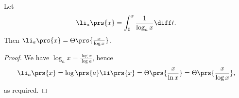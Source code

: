 \documentclass[oneside]{scrbook}
\theoremstyle{definition}
\begin{document}
\begin{corollary} \label{corollary:li-asymptotics}
Let
\begin{align*}
\li_a\prs{x} = \int_0^x \frac{1}{\log_a x} \diff t \text{.}
\end{align*}
Then $\li_a\prs{x} = \Theta\prs{\frac{x}{\log x}}$.
\end{corollary}

\begin{proof}
We have $\log_a x = \frac{\log x}{\log a}$, hence \[\li_a\prs{x} = \log \prs{a} \li\prs{x} = \Theta\prs{\frac{x}{\ln x}} = \Theta\prs{\frac{x}{\log x}} \text{,}\]
as required.
\end{proof}

\printbibliography
\printindex
\end{document}
